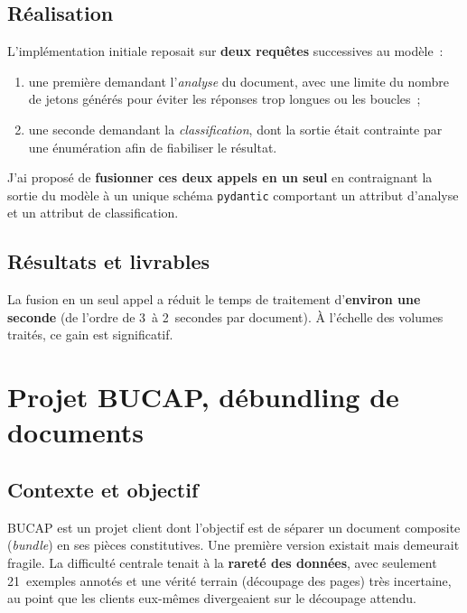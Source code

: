 \subsection{Réalisation}
L'implémentation initiale reposait sur \textbf{deux requêtes} successives au modèle~:
\begin{enumerate}
  \item une première demandant l'\emph{analyse} du document, avec une limite du
        nombre de jetons générés pour éviter les réponses trop longues ou les
        boucles~;
  \item une seconde demandant la \emph{classification}, dont la sortie était
        contrainte par une énumération afin de fiabiliser le résultat.
\end{enumerate}

J'ai proposé de \textbf{fusionner ces deux appels en un seul} en contraignant la
sortie du modèle à un unique schéma \texttt{pydantic} comportant un attribut
d'analyse et un attribut de classification.

\subsection{Résultats et livrables}
La fusion en un seul appel a réduit le temps de traitement d'\textbf{environ une
seconde} (de l'ordre de 3~à 2~secondes par document). À l'échelle des volumes
traités, ce gain est significatif.

\section{Projet BUCAP, débundling de documents}

\subsection{Contexte et objectif}
BUCAP est un projet client dont l'objectif est de séparer un document composite
(\emph{bundle}) en ses pièces constitutives. Une première version existait mais
demeurait fragile. La difficulté centrale tenait à la \textbf{rareté des données},
avec seulement 21~exemples annotés et une vérité terrain (découpage des pages) très
incertaine, au point que les clients eux-mêmes divergeaient sur le découpage attendu.

